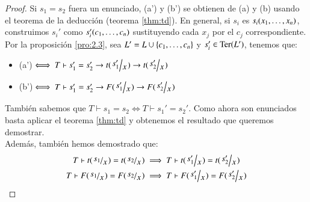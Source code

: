 \begin{proof}
    Si $s_1 = s_2$ fuera un enunciado, (a') y (b') se obtienen de (a) y (b) usando el teorema de la deducción (teorema \ref{thm:td}). En general, si $s_i$ es $s_i({x}_{1}, \ldots, {x}_{n})$, construimos $s_i'$ como $s_i'({c}_{1}, \ldots, {c}_{n})$ sustituyendo cada $x_j$ por el $c_j$ correspondiente.\\
    Por la proposición \ref{pro:2.3}, sea $L' = L \cup \left\{{c}_{1}, \ldots, {c}_{n}\right\}$ y $s_i' \in \mathrm{Ter}(L')$, tenemos que:
    \begin{itemize}
        \item[] (a')$\iff T \vdash s'_1 = s'_2 \then t(\quox{s'_1}) \then t(\quox{s'_2})$
        \item[] (b')$\iff T \vdash s'_1 = s'_2 \then F(\quox{s'_1}) \then F(\quox{s'_2})$
    \end{itemize}
    También sabemos que $T \vdash s_1 = s_2 \iff T \vdash s_1' = s_2'$. Como ahora son enunciados basta aplicar el teorema \ref{thm:td} y obtenemos el resultado que queremos demostrar.\\
    Además, también hemos demostrado que:
        \begin{gather*}
            T \vdash t(\quox{s_1}) = t(\quox{s_2}) \implies T \vdash t(\quox{s_1'}) = t(\quox{s_2'})\\
            T \vdash F(\quox{s_1}) = F(\quox{s_2}) \implies T \vdash F(\quox{s_1'}) = F(\quox{s_2'})
        \end{gather*}
\end{proof}
